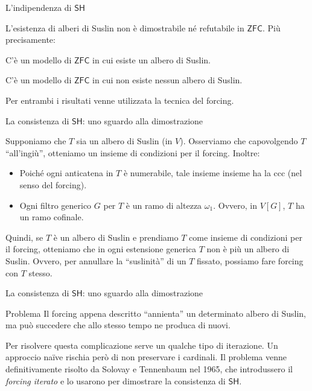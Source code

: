 \documentclass{beamer}
\theoremstyle{num.custom-title}
\theoremstyle{custom-title}
\newcommand{\ZFC}{\ensuremath{\mathsf{ZFC}}\xspace}
\newcommand{\SH}{\ensuremath{\mathsf{SH}}\xspace}
\begin{document}
\begin{frame}{L'indipendenza di \SH}

L'esistenza di alberi di Suslin non è dimostrabile né refutabile in \ZFC. Più precisamente:

\begin{theorem}[Tennenbaum, 1963]
C'è un modello di \ZFC in cui esiste un albero di Suslin.
\end{theorem}

\begin{theorem}
C'è un modello di \ZFC in cui non esiste nessun albero di Suslin.
\end{theorem}

Per entrambi i risultati venne utilizzata la tecnica del forcing.

\end{frame}


\begin{frame}{La consistenza di \SH: uno sguardo alla dimostrazione}

Supponiamo che $T$ sia un albero di Suslin (in $V$). Osserviamo che capovolgendo $T$ ``all'ingiù'', otteniamo un insieme di condizioni per il forcing. Inoltre:
\begin{itemize}
\item  Poiché ogni anticatena in $T$ è numerabile, tale insieme insieme ha la ccc (nel senso del forcing).
\item Ogni filtro generico $G$ per $T$ è un ramo di altezza $\omega_1$. Ovvero, in $V[G]$, $T$ ha un ramo cofinale.
\end{itemize}

Quindi, se $T$ è un albero di Suslin e prendiamo $T$ come insieme di condizioni per il forcing, otteniamo che in ogni estensione generica $T$ non è più un albero di Suslin. Ovvero, per annullare la ``suslinità'' di un $T$ fissato, possiamo fare forcing con $T$ stesso.

\end{frame}


\begin{frame}{La consistenza di \SH: uno sguardo alla dimostrazione}

\begin{alertblock}{Problema}
Il forcing appena descritto ``annienta'' un determinato albero di Suslin, ma può succedere che allo stesso tempo ne produca di nuovi.
\end{alertblock}

Per risolvere questa complicazione serve un qualche tipo di iterazione. Un approccio naïve rischia però di non preservare i cardinali. Il problema venne definitivamente risolto da Solovay e Tennenbaum nel 1965, che introdussero il \emph{forcing iterato} e lo usarono per dimostrare la consistenza di \SH.

\end{frame}
\end{document}
